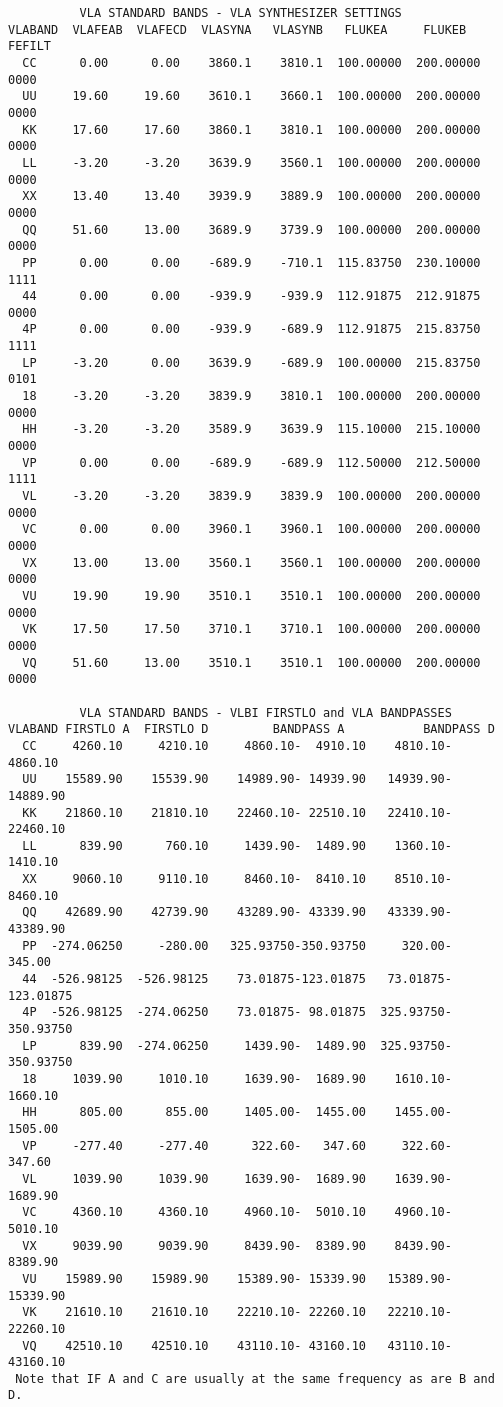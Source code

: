 \documentclass{report}
\begin{document}
\begin{verbatim}
          VLA STANDARD BANDS - VLA SYNTHESIZER SETTINGS
VLABAND  VLAFEAB  VLAFECD  VLASYNA   VLASYNB   FLUKEA     FLUKEB  FEFILT
  CC      0.00      0.00    3860.1    3810.1  100.00000  200.00000  0000
  UU     19.60     19.60    3610.1    3660.1  100.00000  200.00000  0000
  KK     17.60     17.60    3860.1    3810.1  100.00000  200.00000  0000
  LL     -3.20     -3.20    3639.9    3560.1  100.00000  200.00000  0000
  XX     13.40     13.40    3939.9    3889.9  100.00000  200.00000  0000
  QQ     51.60     13.00    3689.9    3739.9  100.00000  200.00000  0000
  PP      0.00      0.00    -689.9    -710.1  115.83750  230.10000  1111
  44      0.00      0.00    -939.9    -939.9  112.91875  212.91875  0000
  4P      0.00      0.00    -939.9    -689.9  112.91875  215.83750  1111
  LP     -3.20      0.00    3639.9    -689.9  100.00000  215.83750  0101
  18     -3.20     -3.20    3839.9    3810.1  100.00000  200.00000  0000
  HH     -3.20     -3.20    3589.9    3639.9  115.10000  215.10000  0000
  VP      0.00      0.00    -689.9    -689.9  112.50000  212.50000  1111
  VL     -3.20     -3.20    3839.9    3839.9  100.00000  200.00000  0000
  VC      0.00      0.00    3960.1    3960.1  100.00000  200.00000  0000
  VX     13.00     13.00    3560.1    3560.1  100.00000  200.00000  0000
  VU     19.90     19.90    3510.1    3510.1  100.00000  200.00000  0000
  VK     17.50     17.50    3710.1    3710.1  100.00000  200.00000  0000
  VQ     51.60     13.00    3510.1    3510.1  100.00000  200.00000  0000

          VLA STANDARD BANDS - VLBI FIRSTLO and VLA BANDPASSES
VLABAND FIRSTLO A  FIRSTLO D         BANDPASS A           BANDPASS D
  CC     4260.10     4210.10     4860.10-  4910.10    4810.10-  4860.10
  UU    15589.90    15539.90    14989.90- 14939.90   14939.90- 14889.90
  KK    21860.10    21810.10    22460.10- 22510.10   22410.10- 22460.10
  LL      839.90      760.10     1439.90-  1489.90    1360.10-  1410.10
  XX     9060.10     9110.10     8460.10-  8410.10    8510.10-  8460.10
  QQ    42689.90    42739.90    43289.90- 43339.90   43339.90- 43389.90
  PP  -274.06250     -280.00   325.93750-350.93750     320.00-   345.00
  44  -526.98125  -526.98125    73.01875-123.01875   73.01875-123.01875
  4P  -526.98125  -274.06250    73.01875- 98.01875  325.93750-350.93750
  LP      839.90  -274.06250     1439.90-  1489.90  325.93750-350.93750
  18     1039.90     1010.10     1639.90-  1689.90    1610.10-  1660.10
  HH      805.00      855.00     1405.00-  1455.00    1455.00-  1505.00
  VP     -277.40     -277.40      322.60-   347.60     322.60-   347.60
  VL     1039.90     1039.90     1639.90-  1689.90    1639.90-  1689.90
  VC     4360.10     4360.10     4960.10-  5010.10    4960.10-  5010.10
  VX     9039.90     9039.90     8439.90-  8389.90    8439.90-  8389.90
  VU    15989.90    15989.90    15389.90- 15339.90   15389.90- 15339.90
  VK    21610.10    21610.10    22210.10- 22260.10   22210.10- 22260.10
  VQ    42510.10    42510.10    43110.10- 43160.10   43110.10- 43160.10
 Note that IF A and C are usually at the same frequency as are B and D.

\end{verbatim}
\end{document}
